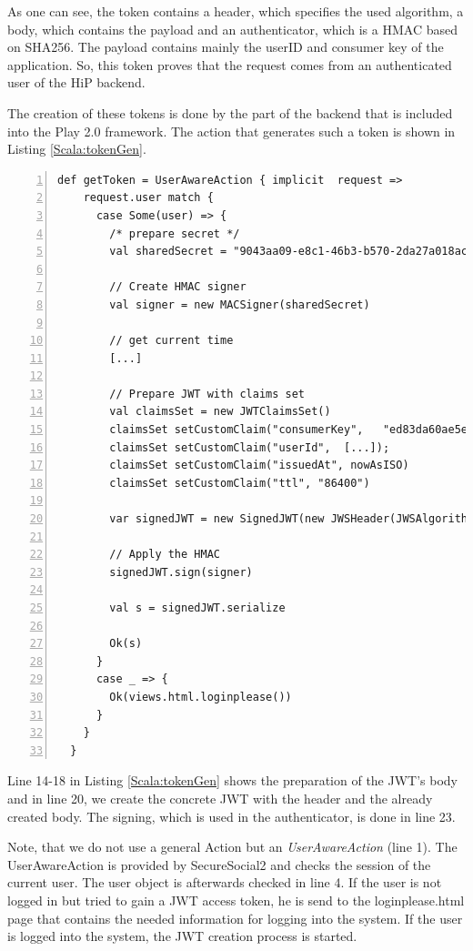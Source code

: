 As one can see, the token contains a header, which specifies the used algorithm, a body, which contains the payload and an authenticator, which is a \ac{HMAC} based on \ac{SHA256}. The payload contains mainly the userID and 
consumer key of the application. So, this token proves that the request comes from an authenticated user of the \ac{HiP} backend.

The creation of these tokens is done by the part of the backend that is included into the Play 2.0 framework. The action that generates such a token is shown in Listing \ref{Scala:tokenGen}.

\begin{lstlisting}[numbers=left,caption={Generation of JWT tokens within the backend},label=Scala:tokenGen,frame=tlbr,breaklines]
def getToken = UserAwareAction { implicit  request =>
    request.user match {
      case Some(user) => {
        /* prepare secret */
        val sharedSecret = "9043aa09-e8c1-46b3-b570-2da27a018ac3" getBytes

        // Create HMAC signer
        val signer = new MACSigner(sharedSecret)

        // get current time
        [...]

        // Prepare JWT with claims set
        val claimsSet = new JWTClaimsSet()
        claimsSet setCustomClaim("consumerKey",   "ed83da60ae5e4d159729eef16a207525")
        claimsSet setCustomClaim("userId",  [...]);
        claimsSet setCustomClaim("issuedAt", nowAsISO)
        claimsSet setCustomClaim("ttl", "86400")

        var signedJWT = new SignedJWT(new JWSHeader(JWSAlgorithm.HS256), claimsSet)

        // Apply the HMAC
        signedJWT.sign(signer)

        val s = signedJWT.serialize

        Ok(s)
      }
      case _ => {
        Ok(views.html.loginplease())
      }
    }
  }
\end{lstlisting}

Line 14-18 in Listing \ref{Scala:tokenGen} shows the preparation of the JWT's body and in line 20, we create the concrete JWT with the header and the already created body. The signing, which is used in the authenticator, is done in line 23. 

Note, that we do not use a general Action but an \emph{UserAwareAction} (line 1).
The UserAwareAction is provided by SecureSocial2 and checks the session of the current user. The user object is afterwards checked in line 4. If the user is not logged in but tried to gain a JWT access token, he is send to the loginplease.html page that contains the needed information for logging into the system. If the user is logged into the system, the JWT creation process is started.

